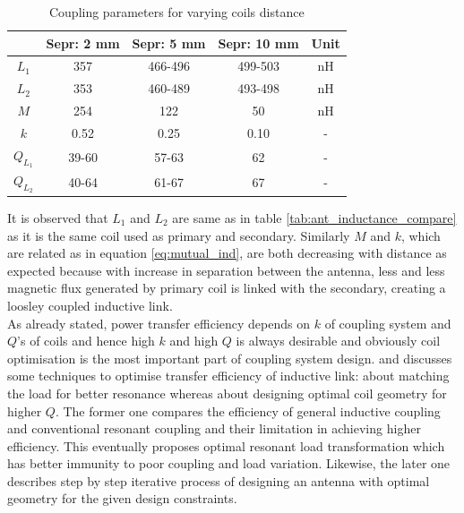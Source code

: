 \documentclass[UKenglish]{ifimaster}  %
\begin{document}
\begin{table}[htbp]
\caption{Coupling parameters for varying coils distance} 
\begin{center}
\begin{tabular}{c|c|c|c|c}
\hline \hline
 			& \textbf{Sepr: 2 mm}	& \textbf{Sepr: 5 mm} 	& \textbf{Sepr: 10 mm}	& \textbf{Unit}\\ \hline \hline
$L_{1}$		& 357					& 466-496				& 499-503				& \si{\nano\henry} \\ \hline
$L_{2}$		& 353					& 460-489				& 493-498				& \si{\nano\henry} \\ \hline
$M$			& 254					& 122					& 50					& \si{\nano\henry} \\ \hline
$k$			& 0.52					& 0.25					& 0.10					& -		   \\ \hline
$Q_{L_{1}}$	& 39-60					& 57-63					& 62	 				& -		   \\ \hline
$Q_{L_{2}}$	& 40-64					& 61-67					& 67	 				& -		   \\
\hline \hline
\end{tabular}
\end{center}
\label{tab:ant_couple_parameter}
\end{table}%

It is observed that $L_{1}$ and $L_{2}$ are same as in table \ref{tab:ant_inductance_compare} as it is the same coil used as primary 
and secondary. Similarly $M$ and $k$, which are related as in equation \ref{eq:mutual_ind}, are both decreasing with distance as expected because with 
increase in separation between the antenna, less and less magnetic flux generated by primary coil is linked with the secondary, creating a loosley
coupled inductive link. \\

As already stated, power transfer efficiency depends on $k$ of coupling system and $Q$'s of coils and hence high $k$ and high $Q$ is always desirable and obviously 
coil optimisation is the most important part of coupling system design. \cite{ant_optimal_resonance} and \cite{ant_PSC_geometry} 
discusses some techniques to optimise transfer efficiency of inductive link: \cite{ant_optimal_resonance} about matching the 
load for better resonance whereas \cite{ant_PSC_geometry} about designing optimal coil geometry for higher $Q$. The former one 
compares the efficiency of general inductive coupling and conventional resonant coupling and their limitation in achieving 
higher efficiency. This eventually proposes optimal resonant load transformation which has better immunity to poor coupling 
and load variation. Likewise, the later one describes step by step iterative process of designing an antenna with optimal geometry for the given 
design constraints. \\
\end{document}
